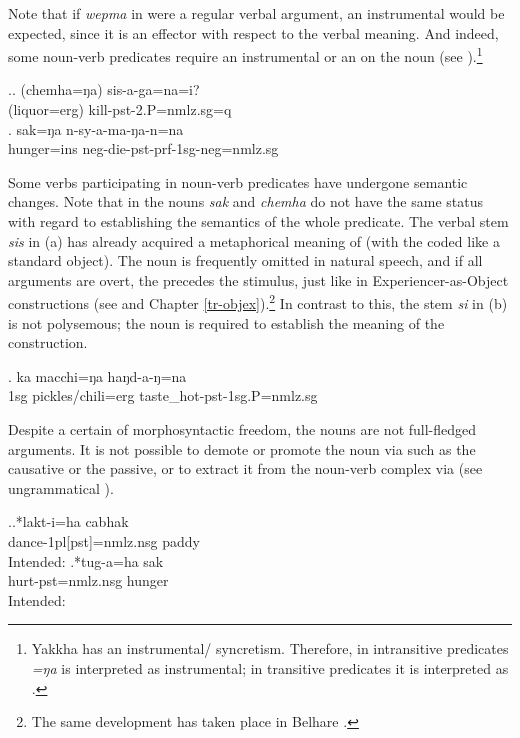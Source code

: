 Note that if \emph{wepma} in  \Last[b] were a regular verbal argument, an instrumental  would be expected, since it is an effector with respect to the verbal meaning. And indeed, some noun-verb predicates require an instrumental or an   on the noun (see \Next).\footnote{Yakkha has an instrumental/ syncretism. Therefore, in intransitive predicates \emph{=ŋa} is interpreted as instrumental; in transitive predicates it is interpreted as .} 

\ex.\ag. (chemha=ŋa) sis-a-ga=na=i?\\
		(liquor{\sc =erg}) kill{\sc -pst-2.P=nmlz.sg=q}\\
	\bg. sak=ŋa n-sy-a-ma-ŋa-n=na\\
			hunger{\sc =ins} {\sc neg-}die{\sc -pst-prf-1sg-neg=nmlz.sg}\\
	
	
Some verbs participating in noun-verb predicates have undergone semantic changes. Note that in \Last the nouns \emph{sak} and \emph{chemha} do not have the same status with regard to establishing the semantics of the whole predicate. The verbal stem \emph{sis}  in (a) has already acquired a metaphorical meaning  of  (with the  coded like a standard object). The noun is frequently omitted in natural speech, and if all arguments are overt, the  precedes the stimulus, just like in Experiencer-as-Object constructions (see \Next and Chapter \ref{tr-objex}).\footnote{The same development has taken place in Belhare \citep[151]{Bickel1997The-possessive}.} In contrast to this, the stem \emph{si} in (b) is not polysemous; the noun is required to establish the meaning of the construction. 
	
\exg. ka macchi=ŋa haŋd-a-ŋ=na\\
	{\sc 1sg}	pickles/chili{\sc =erg} taste\_hot{\sc -pst-1sg.P=nmlz.sg}\\


Despite a certain  of morphosyntactic freedom, the nouns are not full-fledged arguments. It is not possible to demote or promote the noun via  such as the causative or the passive, or to extract it from the noun-verb complex via  (see ungrammatical \Next).
 
\ex.\ag.*lakt-i=ha cabhak\\
dance{\sc -1pl[pst]=nmlz.nsg} paddy\\
Intended: 
\bg.*tug-a=ha sak\\
hurt{\sc [3sg]-pst=nmlz.nsg} hunger\\
Intended: 


